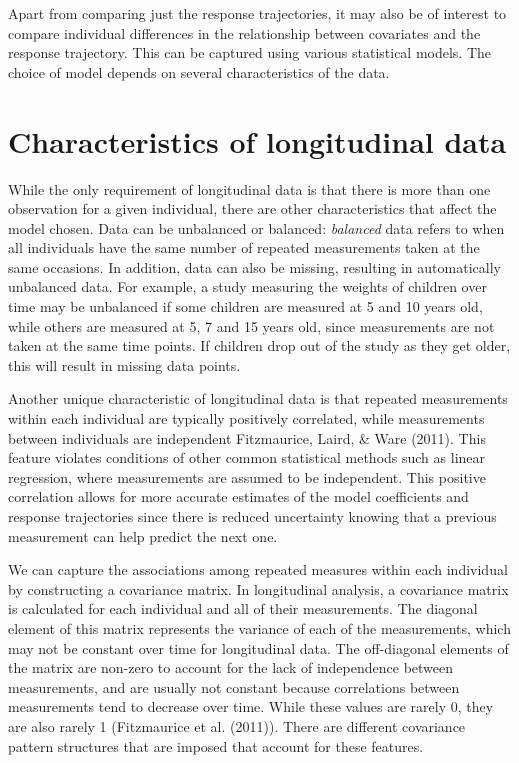 \documentclass[12pt, twoside]{amherstthesis}
\begin{document}
Apart from comparing just the response trajectories, it may also be of interest to compare individual differences in the relationship between covariates and the response trajectory. This can be captured using various statistical models. The choice of model depends on several characteristics of the data.

\hypertarget{characteristics-of-longitudinal-data}{%
\section{Characteristics of longitudinal data}\label{characteristics-of-longitudinal-data}}

While the only requirement of longitudinal data is that there is more than one observation for a given individual, there are other characteristics that affect the model chosen. Data can be unbalanced or balanced: \emph{balanced} data refers to when all individuals have the same number of repeated measurements taken at the same occasions. In addition, data can also be missing, resulting in automatically unbalanced data. For example, a study measuring the weights of children over time may be unbalanced if some children are measured at 5 and 10 years old, while others are measured at 5, 7 and 15 years old, since measurements are not taken at the same time points. If children drop out of the study as they get older, this will result in missing data points.

Another unique characteristic of longitudinal data is that repeated measurements within each individual are typically positively correlated, while measurements between individuals are independent Fitzmaurice, Laird, \& Ware (2011). This feature violates conditions of other common statistical methods such as linear regression, where measurements are assumed to be independent. This positive correlation allows for more accurate estimates of the model coefficients and response trajectories since there is reduced uncertainty knowing that a previous measurement can help predict the next one.

We can capture the associations among repeated measures within each individual by constructing a covariance matrix. In longitudinal analysis, a covariance matrix is calculated for each individual and all of their measurements. The diagonal element of this matrix represents the variance of each of the measurements, which may not be constant over time for longitudinal data. The off-diagonal elements of the matrix are non-zero to account for the lack of independence between measurements, and are usually not constant because correlations between measurements tend to decrease over time. While these values are rarely 0, they are also rarely 1 (Fitzmaurice et al. (2011)). There are different covariance pattern structures that are imposed that account for these features.
\end{document}
